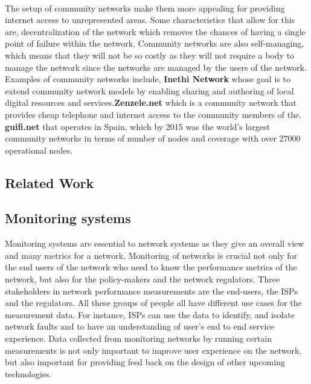 \paragraph{}The setup of community networks make them more appealing for providing internet access to unrepresented areas.
Some characteristics that allow for this are, decentralization of the network\cite{Selimi:2014:TAD:2723218.2723265} which removes the chances of having a single point of failure within the network.
Community networks are also self-managing\cite{Braem:2013:CRC:2500098.2500108}, which means that they will not be so costly as they will not require a body to manage the network since the networks are managed by the users of the network.
Examples of community networks include, \textbf{Inethi Network} whose goal is to extend community network models by enabling sharing and authoring of local digital resources and services\cite{inethi_technologies}.\textbf{Zenzele.net} which is a community network that provides cheap telephone and internet access to the community members of the\cite{zenzeleni.net}.
\textbf{guifi.net} that operates in Spain\cite{guifi}, which by 2015 was the world's largest community networks in terms of number of nodes and coverage with over 27000 operational nodes\cite{2015:TOG:2852375.2852741}.

\subsection{Related Work}\label{subsec:prior-research}
\subsection{Monitoring systems}\label{subsec:monitoring-systems}
Monitoring systems are essential to network systems as they give an overall view and many metrics for a network.
Monitoring of networks is crucial not only for the end users of the network who need to know the performance metrics of the network, but also for the policy-makers and the network regulators\cite{7523537}.
Three stakeholders in network performance measurements are the end-users, the ISPs and the regulators\cite{7076582}.
All these groups of people all have different use cases for the measurement data.
For instance, ISPs can use the data to identify, and isolate network faults and to have an understanding of user's end to end service experience\cite{Ford:2018:RWR:3243157.3243167}.
Data collected from monitoring networks by running certain measurements is not only important to improve user experience on the network, but also important for providing feed back on the design of other upcoming technologies\cite{7523537}.
